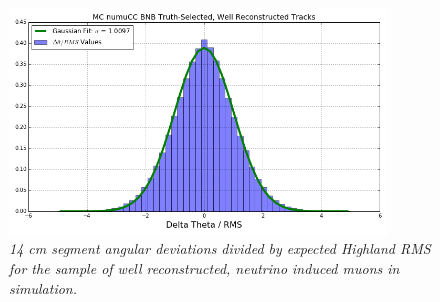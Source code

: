 \begin{figure}[ht!]
\begin{center}
\includegraphics[width=100mm]{Figures/Highland_validation_MCBNBRecoTrack.png}
\end{center}
\caption{\textit{14 cm segment angular deviations divided by expected Highland RMS for the sample of well reconstructed, neutrino induced muons in simulation.}}
\label{Highland_validation_MCBNBRecoTrack_fig}
\end{figure}








